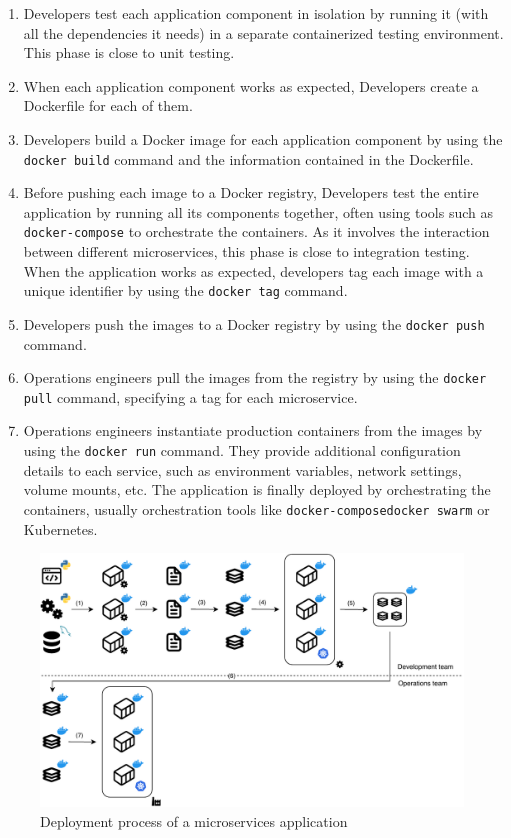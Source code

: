 \begin{enumerate}
    \item Developers test each application component in isolation by running it (with all the dependencies it needs) in a separate containerized testing environment. This phase is close to unit testing. 
    \item When each application component works as expected, Developers create a Dockerfile for each of them.
    \item Developers build a Docker image for each application component by using the \texttt{docker build} command and the information contained in the Dockerfile.
    \item Before pushing each image to a Docker registry, Developers test the entire application by running all its components together, often using tools such as \texttt{docker-compose} to orchestrate the containers. As it involves the interaction between different microservices, this phase is close to integration testing.
    When the application works as expected, developers tag each image with a unique identifier by using the \texttt{docker tag} command.
    \item Developers push the images to a Docker registry by using the \texttt{docker push} command.
    \item Operations engineers pull the images from the registry by using the \texttt{docker pull} command, specifying a tag for each microservice. 
    \item Operations engineers instantiate production containers from the images by using the \texttt{docker run} command. They provide additional configuration details to each service, such as environment variables, network settings, volume mounts, etc. The application is finally deployed by orchestrating the containers, usually orchestration tools like \texttt{docker-compose}\texttt{docker swarm} or Kubernetes.
\end{enumerate}

\begin{figure}[htbp]
    \vspace{10pt}
    \centering
    \includegraphics[width=1\textwidth]{assets/multi_container_deployment.pdf}
    \caption{Deployment process of a microservices application}
    \label{fig:multi_container_deployment}
    \vspace{10pt}
\end{figure}


